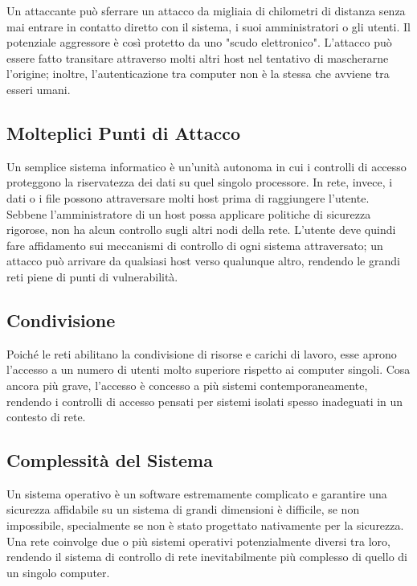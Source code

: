 \documentclass{article}
\begin{document}
Un attaccante può sferrare un attacco da migliaia di chilometri di distanza senza mai entrare in contatto diretto con il sistema, i suoi amministratori o gli utenti. Il potenziale aggressore è così protetto da uno "scudo elettronico". L'attacco può essere fatto transitare attraverso molti altri host nel tentativo di mascherarne l'origine; inoltre, l'autenticazione tra computer non è la stessa che avviene tra esseri umani.

\subsection*{Molteplici Punti di Attacco}

Un semplice sistema informatico è un'unità autonoma in cui i controlli di accesso proteggono la riservatezza dei dati su quel singolo processore. In rete, invece, i dati o i file possono attraversare molti host prima di raggiungere l'utente. Sebbene l'amministratore di un host possa applicare politiche di sicurezza rigorose, non ha alcun controllo sugli altri nodi della rete. L'utente deve quindi fare affidamento sui meccanismi di controllo di ogni sistema attraversato; un attacco può arrivare da qualsiasi host verso qualunque altro, rendendo le grandi reti piene di punti di vulnerabilità.

\subsection*{Condivisione}

Poiché le reti abilitano la condivisione di risorse e carichi di lavoro, esse aprono l'accesso a un numero di utenti molto superiore rispetto ai computer singoli. Cosa ancora più grave, l'accesso è concesso a più sistemi contemporaneamente, rendendo i controlli di accesso pensati per sistemi isolati spesso inadeguati in un contesto di rete.

\subsection*{Complessità del Sistema}

Un sistema operativo è un software estremamente complicato e garantire una sicurezza affidabile su un sistema di grandi dimensioni è difficile, se non impossibile, specialmente se non è stato progettato nativamente per la sicurezza. Una rete coinvolge due o più sistemi operativi potenzialmente diversi tra loro, rendendo il sistema di controllo di rete inevitabilmente più complesso di quello di un singolo computer.
\end{document}
